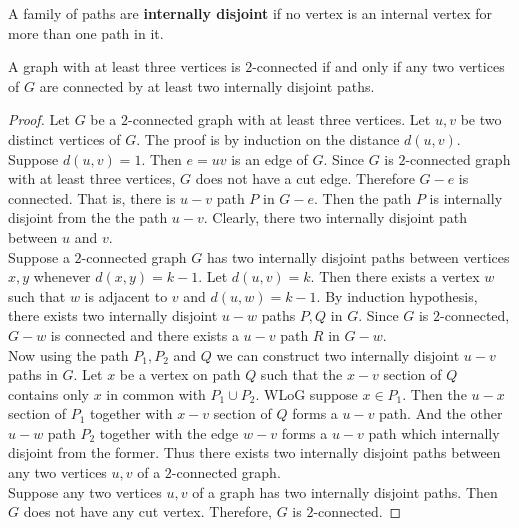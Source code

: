 \begin{definition}
	A family of paths are \textbf{internally disjoint} if no vertex is an internal vertex for more than one path in it.
\end{definition}

\begin{theorem}[Whitney]
	A graph with at least three vertices is $2$-connected if and only if any two vertices of $G$ are connected by at least two internally disjoint paths.
\end{theorem}
\begin{proof}
	Let $G$ be a $2$-connected graph with at least three vertices. Let $u,v$ be two distinct vertices of $G$. The proof is by induction on the distance $d(u,v)$.\\
	
	Suppose $d(u,v) = 1$. Then $e = uv$ is an edge of $G$. Since $G$ is $2$-connected graph with at least three vertices, $G$ does not have a cut edge. Therefore $G-e$ is connected. That is, there is $u-v$ path $P$ in $G-e$. Then the path $P$ is internally disjoint from the the path $u-v$. Clearly, there two internally disjoint path between $u$ and $v$.\\

	Suppose a $2$-connected graph $G$ has two internally disjoint paths between vertices $x,y$ whenever $d(x,y) = k-1$. Let $d(u,v) = k$. Then there exists a vertex $w$ such that $w$ is adjacent to $v$ and $d(u,w) = k-1$. By induction hypothesis, there exists two internally disjoint $u-w$ paths $P,Q$ in $G$. Since $G$ is $2$-connected, $G-w$ is connected and there exists a $u-v$ path $R$ in $G-w$.\\

	Now using the path $P_1,P_2$ and $Q$ we can construct two internally disjoint $u-v$ paths in $G$. Let $x$ be a vertex on path $Q$ such that the $x-v$ section of $Q$ contains only $x$ in common with $P_1 \cup P_2$. WLoG suppose $x \in P_1$. Then the $u-x$ section of $P_1$ together with $x-v$ section of $Q$ forms a $u-v$ path. And the other $u-w$ path $P_2$ together with the edge $w-v$ forms a $u-v$ path which internally disjoint from the former. Thus there exists two internally disjoint paths between any two vertices $u,v$ of a $2$-connected graph.\\

	Suppose any two vertices $u,v$ of a graph has two internally disjoint paths. Then $G$ does not have any cut vertex. Therefore, $G$ is $2$-connected.
\end{proof}

